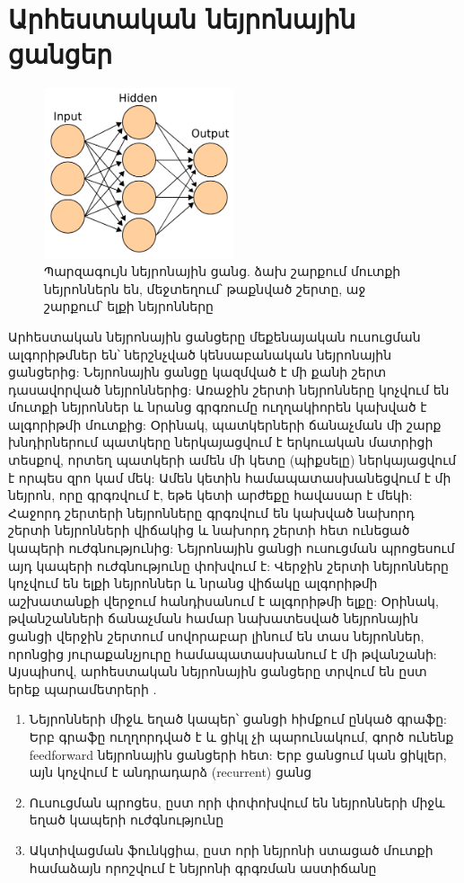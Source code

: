\documentclass[12pt,final]{amsproc}
\begin{document}
\section{Արհեստական նեյրոնային ցանցեր}

\begin{figure}[b!]
\centering
\includegraphics[width=0.5\textwidth]{ann.png}
\caption{Պարզագույն նեյրոնային ցանց. ձախ շարքում մուտքի նեյրոններն են, մեջտեղում՝ թաքնված շերտը, աջ շարքում՝ ելքի նեյրոնները \cite{WikiANNImage}}
\label{ANN}
\end{figure}

Արհեստական նեյրոնային ցանցերը մեքենայական ուսուցման ալգորիթմներ են՝ ներշնչված կենսաբանական նեյրոնային ցանցերից: Նեյրոնային ցանցը կազմված է մի քանի շերտ դասավորված նեյրոններից: Առաջին շերտի նեյրոնները կոչվում են մուտքի նեյրոններ և նրանց գրգռումը ուղղակիորեն կախված է ալգորիթմի մուտքից: Օրինակ, պատկերների ճանաչման մի շարք խնդիրներում պատկերը ներկայացվում է երկուական մատրիցի տեսքով, որտեղ պատկերի ամեն մի կետը (պիքսելը) ներկայացվում է որպես զրո կամ մեկ: Ամեն կետին համապատասխանեցվում է մի նեյրոն, որը գրգռվում է, եթե կետի արժեքը հավասար է մեկի: Հաջորդ շերտերի նեյրոնները գրգռվում են կախված նախորդ շերտի նեյրոնների վիճակից և նախորդ շերտի հետ ունեցած կապերի ուժգնությունից: Նեյրոնային ցանցի ուսուցման պրոցեսում այդ կապերի ուժգնությունը փոխվում է: Վերջին շերտի նեյրոնները կոչվում են ելքի նեյրոններ և նրանց վիճակը ալգորիթմի աշխատանքի վերջում հանդիսանում է ալգորիթմի ելքը: Օրինակ, թվանշանների ճանաչման համար նախատեսված նեյրոնային ցանցի վերջին շերտում սովորաբար լինում են տաս նեյրոններ, որոնցից յուրաքանչյուրը համապատասխանում է մի թվանշանի: Այսպիսով, արհեստական նեյրոնային ցանցերը տրվում են ըստ երեք պարամետրերի \cite{WikiANN}.

\begin{enumerate}
\item Նեյրոնների միջև եղած կապեր՝ ցանցի հիմքում ընկած գրաֆը: Երբ գրաֆը ուղղորդված է և ցիկլ չի պարունակում, գործ ունենք feedforward նեյրոնային ցանցերի հետ: Երբ ցանցում կան ցիկլեր, այն կոչվում է անդրադարձ (recurrent) ցանց
\item Ուսուցման պրոցես, ըստ որի փոփոխվում են նեյրոնների միջև եղած կապերի ուժգնությունը
\item Ակտիվացման ֆունկցիա, ըստ որի նեյրոնի ստացած մուտքի համաձայն որոշվում է նեյրոնի գրգռման աստիճանը
\end{enumerate}
\end{document}
